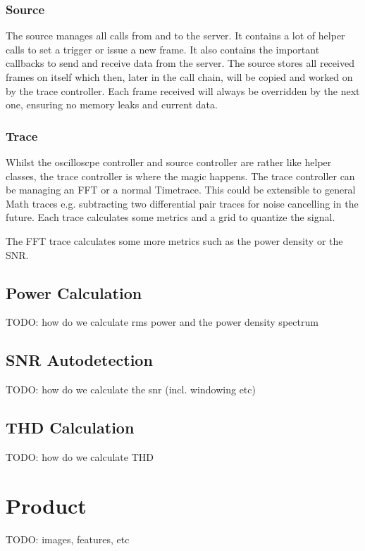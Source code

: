\subsubsection*{Source}

The source manages all calls from and to the server. It contains a lot of helper calls to set a trigger or issue a new frame.
It also contains the important callbacks to send and receive data from the server.
The source stores all received frames on itself which then, later in the call chain, will be copied and worked on by the trace controller.
Each frame received will always be overridden by the next one, ensuring no memory leaks and current data.

\subsubsection*{Trace}

Whilst the oscilloscpe controller and source controller are rather like helper classes, the trace controller is where the magic happens.
The trace controller can be managing an FFT or a normal Timetrace. This could be extensible to general Math traces e.g. subtracting two differential pair traces for noise cancelling in the future.
Each trace calculates some metrics and a grid to quantize the signal.

The FFT trace calculates some more metrics such as the power density or the SNR.

\subsection{Power Calculation}

TODO: how do we calculate rms power and the power density spectrum

\subsection{SNR Autodetection}

TODO: how do we calculate the snr (incl. windowing etc)

\subsection{THD Calculation}

TODO: how do we calculate THD

\section{Product}

TODO: images, features, etc


